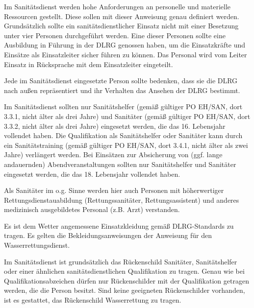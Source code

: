 
\renewcommand{\dienstanweisung}{DA\,3-01/2013}
\thispagestyle{scrheadings}
Im Sanitätsdienst werden hohe Anforderungen an personelle und materielle Ressourcen gestellt. Diese sollen mit dieser Anweisung genau definiert werden.
Grundsätzlich sollte ein sanitätsdienstlicher Einsatz nicht mit einer Besetzung unter vier Personen durchgeführt werden. Eine dieser Personen sollte eine Ausbildung in Führung in der DLRG genossen haben, um die Einsatzkräfte und Einsätze als Einsatzleiter sicher führen zu können. Das Personal wird vom Leiter Einsatz in Rücksprache mit dem Einsatzleiter eingeteilt.

Jede im Sanitätsdienst eingesetzte Person sollte bedenken, dass sie die DLRG nach außen repräsentiert und ihr Verhalten das Ansehen der DLRG bestimmt.


Im Sanitätsdienst sollten nur Sanitätshelfer (gemäß gültiger PO EH/SAN, dort 3.3.1, nicht älter als drei Jahre) und Sanitäter (gemäß gültiger PO EH/SAN, dort 3.3.2, nicht älter als drei Jahre) eingesetzt werden, die das 16. Lebensjahr vollendet haben.
Die Qualifikation als Sanitätshelfer oder Sanitäter kann durch ein Sanitätstraining (gemäß gültiger PO EH/SAN, dort 3.4.1, nicht älter als zwei Jahre) verlängert werden.
Bei Einsätzen zur Absicherung von (ggf. lange andauernden) Abendveranstaltungen sollten nur Sanitätshelfer und Sanitäter eingesetzt werden, die das 18. Lebensjahr vollendet haben.

Als Sanitäter im o.g. Sinne werden hier auch Personen mit höherwertiger Rettungsdienstauabildung (Rettungssanitäter, Rettungsassistent) und anderes medizinisch ausgebildetes Personal (z.B. Arzt) verstanden.

Es ist dem Wetter angemessene Einsatzkleidung gemäß DLRG-Standards zu tragen. Es gelten die Bekleidungsanweisungen der Anweisung für den Wasserrettungsdienst.

Im Sanitätsdienst ist grundsätzlich das Rückenschild \glqq Sanitäter\grqq{}, \glqq Sanitätshelfer\grqq{} oder einer ähnlichen sanitätsdienstlichen Qualifikation zu tragen. Genau wie bei Qualifikationsabzeichen dürfen nur Rückenschilder mit der Qualifikation getragen werden, die die Person besitzt. Sind keine geeigneten Rückenschilder vorhanden, ist es gestattet, das Rückenschild \glqq Wasserrettung\grqq{} zu tragen.


